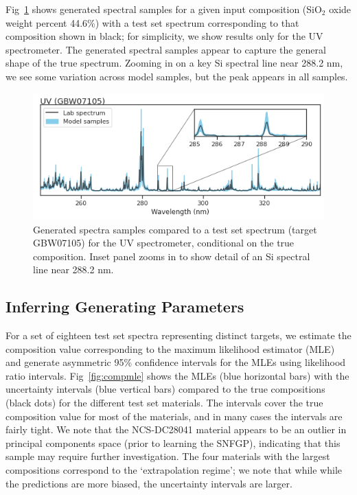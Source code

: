 \documentclass[letterpaper]{article} %
\begin{document}
Fig~\ref{fig:genspectra} shows generated spectral samples for a given input composition (SiO$_2$ oxide weight percent 44.6\%) with a test set spectrum corresponding to that composition shown in black; for simplicity, we show results only for the UV spectrometer.
The generated spectral samples appear to capture the general shape of the true spectrum. 
Zooming in on a key Si spectral line near 288.2 nm, we see some variation across model samples, but the peak appears in all samples.

\begin{figure}
    \centering
    \includegraphics[width=\linewidth]{figures/uvspectra.png}
    \caption{Generated spectra samples compared to a test set spectrum (target GBW07105) for the UV spectrometer, conditional on the true composition. Inset panel zooms in to show detail of an Si spectral line near 288.2 nm.}
    \label{fig:genspectra}
\end{figure}

\subsection{Inferring Generating Parameters}
For a set of eighteen test set spectra representing distinct targets, we estimate the composition value corresponding to the maximum likelihood estimator (MLE) and generate asymmetric 95\% confidence intervals for the MLEs using likelihood ratio intervals.
Fig~\ref{fig:compmle} shows the MLEs (blue horizontal bars) with the uncertainty intervals (blue vertical bars) compared to the true compositions (black dots) for the different test set materials.
The intervals cover the true composition value for most of the materials, and in many cases the intervals are fairly tight.
We note that the NCS-DC28041 material appears to be an outlier in principal components space (prior to learning the SNFGP), indicating that this sample may require further investigation.
The four materials with the largest compositions correspond to the `extrapolation regime'; we note that while while the predictions are more biased, the uncertainty intervals are larger.
\end{document}
